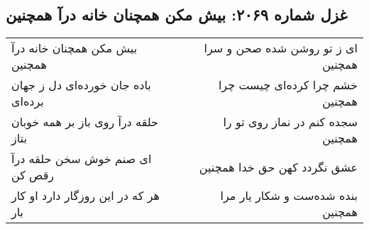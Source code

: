 \begin{center}
\section*{غزل شماره ۲۰۶۹: بیش مکن همچنان خانه درآ همچنین}
\label{sec:2069}
\begin{longtable}{l p{0.5cm} r}
بیش مکن همچنان خانه درآ همچنین
&&
ای ز تو روشن شده صحن و سرا همچنین
\\
باده جان خورده‌ای دل ز جهان برده‌ای
&&
خشم چرا کرده‌ای چیست چرا همچنین
\\
حلقه درآ روی باز بر همه خوبان بتاز
&&
سجده کنم در نماز روی تو را همچنین
\\
ای صنم خوش سخن حلقه درآ رقص کن
&&
عشق نگردد کهن حق خدا همچنین
\\
هر که در این روزگار دارد او کار بار
&&
بنده شده‌ست و شکار یار مرا همچنین
\\
\end{longtable}
\end{center}
